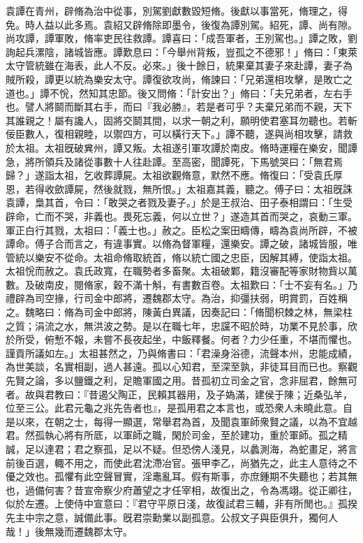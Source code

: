 \begin{pinyinscope}
袁譚在青州，辟脩為治中從事，別駕劉獻數毀短脩。後獻以事當死，脩理之，得免。時人益以此多焉。袁紹又辟脩除即墨令，後復為譚別駕。紹死，譚、尚有隙。尚攻譚，譚軍敗，脩率吏民往救譚。譚喜曰：「成吾軍者，王別駕也。」譚之敗，劉詢起兵漯陰，諸城皆應。譚歎息曰：「今舉州背叛，豈孤之不德邪！」脩曰：「東萊太守管統雖在海表，此人不反。必來。」後十餘日，統果棄其妻子來赴譚，妻子為賊所殺，譚更以統為樂安太守。譚復欲攻尚，脩諫曰：「兄弟還相攻擊，是敗亡之道也。」譚不恱，然知其忠節。後又問脩：「計安出？」脩曰：「夫兄弟者，左右手也。譬人將鬬而斷其右手，而曰『我必勝』，若是者可乎？夫棄兄弟而不親，天下其誰親之！屬有讒人，固將交鬬其間，以求一朝之利，願明使君塞耳勿聽也。若斬佞臣數人，復相親睦，以禦四方，可以橫行天下。」譚不聽，遂與尚相攻擊，請救於太祖。太祖旣破兾州，譚又叛。太祖遂引軍攻譚於南皮。脩時運糧在樂安，聞譚急，將所領兵及諸從事數十人往赴譚。至高密，聞譚死，下馬號哭曰：「無君焉歸？」遂詣太祖，乞收葬譚屍。太祖欲觀脩意，默然不應。脩復曰：「受袁氏厚恩，若得收歛譚屍，然後就戮，無所恨。」太祖嘉其義，聽之。傅子曰：太祖旣誅袁譚，梟其首，令曰：「敢哭之者戮及妻子。」於是王叔治、田子泰相謂曰：「生受辟命，亡而不哭，非義也。畏死忘義，何以立世？」遂造其首而哭之，哀動三軍。軍正白行其戮，太祖曰：「義士也。」赦之。臣松之案田疇傳，疇為袁尚所辟，不被譚命。傅子合而言之，有違事實。以脩為督軍糧，還樂安。譚之破，諸城皆服，唯管統以樂安不從命。太祖命脩取統首，脩以統亡國之忠臣，因解其縛，使詣太祖。太祖恱而赦之。袁氏政寬，在職勢者多畜聚。太祖破鄴，籍沒審配等家財物貲以萬數。及破南皮，閱脩家，穀不滿十斛，有書數百卷。太祖歎曰：「士不妄有名。」乃禮辟為司空掾，行司金中郎將，遷魏郡太守。為治，抑彊扶弱，明賞罰，百姓稱之。魏略曰：脩為司金中郎將，陳黃白異議，因奏記曰：「脩聞枳棘之林，無梁柱之質；涓流之水，無洪波之勢。是以在職七年，忠讜不昭於時，功業不見於事，欣於所受，俯慙不報，未嘗不長夜起坐，中飯釋餐。何者？力少任重，不堪而懼也。謹貢所議如左。」太祖甚然之，乃與脩書曰：「君澡身浴德，流聲本州，忠能成績，為世美談，名實相副，過人甚遠。孤以心知君，至深至孰，非徒耳目而已也。察觀先賢之論，多以鹽鐵之利，足贍軍國之用。昔孤初立司金之官，念非屈君，餘無可者。故與君教曰：『昔遏父陶正，民賴其器用，及子媯滿，建侯于陳；近桑弘羊，位至三公。此君元龜之兆先告者也』，是孤用君之本言也，或恐衆人未曉此意。自是以來，在朝之士，每得一顯選，常舉君為首，及聞袁軍師衆賢之議，以為不宜越君。然孤執心將有所厎，以軍師之職，閑於司金，至於建功，重於軍師。孤之精誠，足以達君；君之察孤，足以不疑。但恐傍人淺見，以蠡測海，為蛇畫足，將言前後百選，輙不用之，而使此君沈滯冶官。張甲李乙，尚猶先之，此主人意待之不優之效也。孤懼有此空聲冒實，淫鼃亂耳。假有斯事，亦庶鍾期不失聽也；若其無也，過備何害？昔宣帝察少府蕭望之才任宰相，故復出之，令為馮翊。從正卿往，似於左遷。上使侍中宣意曰：『君守平原日淺，故復試君三輔，非有所閒也。』孤揆先主中宗之意，誠備此事。旣君崇勳業以副孤意。公叔文子與臣俱升，獨何人哉！」後無幾而遷魏郡太守。


\end{pinyinscope}
